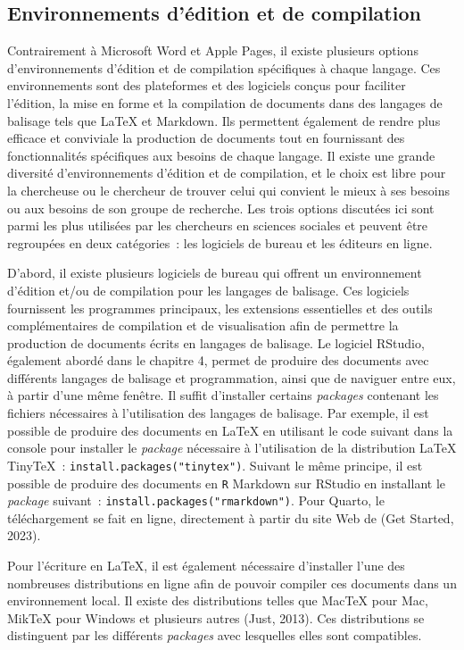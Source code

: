 \documentclass[
  letterpaper,
  DIV=11,
  numbers=noendperiod]{scrreprt}
\begin{document}
\subsection{Environnements d'édition et de
compilation}\label{environnements-duxe9dition-et-de-compilation}

Contrairement à Microsoft Word et Apple Pages, il existe plusieurs
options d'environnements d'édition et de compilation spécifiques à
chaque langage. Ces environnements sont des plateformes et des logiciels
conçus pour faciliter l'édition, la mise en forme et la compilation de
documents dans des langages de balisage tels que LaTeX et Markdown. Ils
permettent également de rendre plus efficace et conviviale la production
de documents tout en fournissant des fonctionnalités spécifiques aux
besoins de chaque langage. Il existe une grande diversité
d'environnements d'édition et de compilation, et le choix est libre pour
la chercheuse ou le chercheur de trouver celui qui convient le mieux à
ses besoins ou aux besoins de son groupe de recherche. Les trois options
discutées ici sont parmi les plus utilisées par les chercheurs en
sciences sociales et peuvent être regroupées en deux catégories~: les
logiciels de bureau et les éditeurs en ligne.

D'abord, il existe plusieurs logiciels de bureau qui offrent un
environnement d'édition et/ou de compilation pour les langages de
balisage. Ces logiciels fournissent les programmes principaux, les
extensions essentielles et des outils complémentaires de compilation et
de visualisation afin de permettre la production de documents écrits en
langages de balisage. Le logiciel RStudio, également abordé dans le
chapitre 4, permet de produire des documents avec différents langages de
balisage et programmation, ainsi que de naviguer entre eux, à partir
d'une même fenêtre. Il suffit d'installer certains \emph{packages}
contenant les fichiers nécessaires à l'utilisation des langages de
balisage. Par exemple, il est possible de produire des documents en
LaTeX en utilisant le code suivant dans la console pour installer le
\emph{package} nécessaire à l'utilisation de la distribution LaTeX
TinyTeX~: \texttt{install.packages("tinytex")}. Suivant le même
principe, il est possible de produire des documents en \texttt{R}
Markdown sur RStudio en installant le \emph{package} suivant~:
\texttt{install.packages("rmarkdown")}. Pour Quarto, le téléchargement
se fait en ligne, directement à partir du site Web de (Get {Started},
2023).

Pour l'écriture en LaTeX, il est également nécessaire d'installer l'une
des nombreuses distributions en ligne afin de pouvoir compiler ces
documents dans un environnement local. Il existe des distributions
telles que MacTeX pour Mac, MikTeX pour Windows et plusieurs autres
(Just, 2013). Ces distributions se distinguent par les différents
\emph{packages} avec lesquelles elles sont compatibles.
\end{document}
